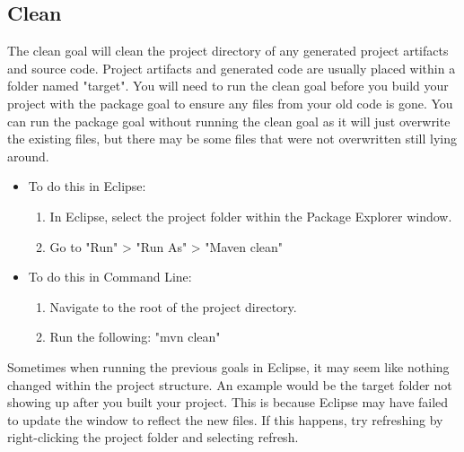 \documentclass{article}
\newenvironment{info}[1][Info:]{ %
	\medskip
	\begin{mdframed}[style=info]
		\noindent{\textbf{#1}}
}{
	\end{mdframed}
}
\begin{document}
\subsection{Clean}
The clean goal will clean the project directory of any generated project artifacts and source code. Project artifacts and generated code are usually placed within a folder named "target". You will need to run the clean goal before you build your project with the package goal to ensure any files from your old code is gone. You can run the package goal without running the clean goal as it will just overwrite the existing files, but there may be some files that were not overwritten still lying around.
\begin{itemize}
\item To do this in Eclipse:
	\begin{enumerate}
	\item In Eclipse, select the project folder within the Package Explorer window.
	\item Go to "Run" > "Run As" > "Maven clean"
	\end{enumerate}
\item To do this in Command Line:
	\begin{enumerate}
	\item Navigate to the root of the project directory.
	\item Run the following: "mvn clean"
	\end{enumerate}
\end{itemize}
\begin{info}[Note:]
Sometimes when running the previous goals in Eclipse, it may seem like nothing changed within the project structure. An example would be the target folder not showing up after you built your project. This is because Eclipse may have failed to update the window to reflect the new files. If this happens, try refreshing by right-clicking the project folder and selecting refresh. 
\end{info}


\end{document}
